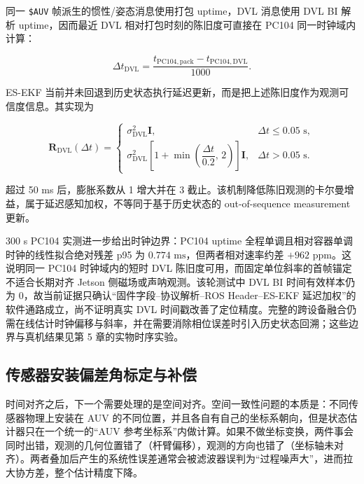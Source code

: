同一 \texttt{\$AUV} 帧派生的惯性/姿态消息使用打包 uptime，DVL 消息使用 DVL BI 解析 uptime，因而最近 DVL 相对打包时刻的陈旧度可直接在 PC104 同一时钟域内计算：

\begin{equation}
\Delta t_{\mathrm{DVL}}
=\frac{t_{\mathrm{PC104,pack}}-t_{\mathrm{PC104,DVL}}}{1000}.
\label{eq:ch03-dvl-staleness}
\end{equation}

ES-EKF 当前并未回退到历史状态执行延迟更新，而是把上述陈旧度作为观测可信度信息。其实现为

\begin{equation}
\boldsymbol{R}_{\mathrm{DVL}}(\Delta t)
=\begin{cases}
\sigma_{\mathrm{DVL}}^2\boldsymbol{I},
& \Delta t\leq 0.05\text{ s},\\
\sigma_{\mathrm{DVL}}^2
\left[1+\min\!\left(\dfrac{\Delta t}{0.2},\,2\right)\right]\boldsymbol{I},
& \Delta t>0.05\text{ s}.
\end{cases}
\label{eq:ch03-dvl-inflation}
\end{equation}

超过 50 ms 后，膨胀系数从 1 增大并在 3 截止。该机制降低陈旧观测的卡尔曼增益，属于延迟感知加权，不等同于基于历史状态的 out-of-sequence measurement 更新。

300 s PC104 实测进一步给出时钟边界：PC104 uptime 全程单调且相对容器单调时钟的线性拟合绝对残差 p95 为 \(0.774\text{ ms}\)，但两者相对速率约差 \(+962\text{ ppm}\)。这说明同一 PC104 时钟域内的短时 DVL 陈旧度可用，而固定单位斜率的首帧锚定不适合长期对齐 Jetson 侧磁场或声呐观测。该轮测试中 DVL BI 时间有效样本仍为 0，故当前证据只确认``固件字段--协议解析--ROS Header--ES-EKF 延迟加权''的软件通路成立，尚不证明真实 DVL 时间戳改善了定位精度。完整的跨设备融合仍需在线估计时钟偏移与斜率，并在需要消除相位误差时引入历史状态回溯；这些边界与真机结果见第 5 章的实物时序实验。

\subsection{传感器安装偏差角标定与补偿}\label{sec:ch03-3-2-2}

时间对齐之后，下一个需要处理的是空间对齐。空间一致性问题的本质是：不同传感器物理上安装在 AUV 的不同位置，并且各自有自己的坐标系朝向，但是状态估计器只在一个统一的``AUV 参考坐标系''内做计算。如果不做坐标变换，两件事会同时出错，观测的几何位置错了（杆臂偏移），观测的方向也错了（坐标轴未对齐）。两者叠加后产生的系统性误差通常会被滤波器误判为``过程噪声大''，进而拉大协方差，整个估计精度下降。

